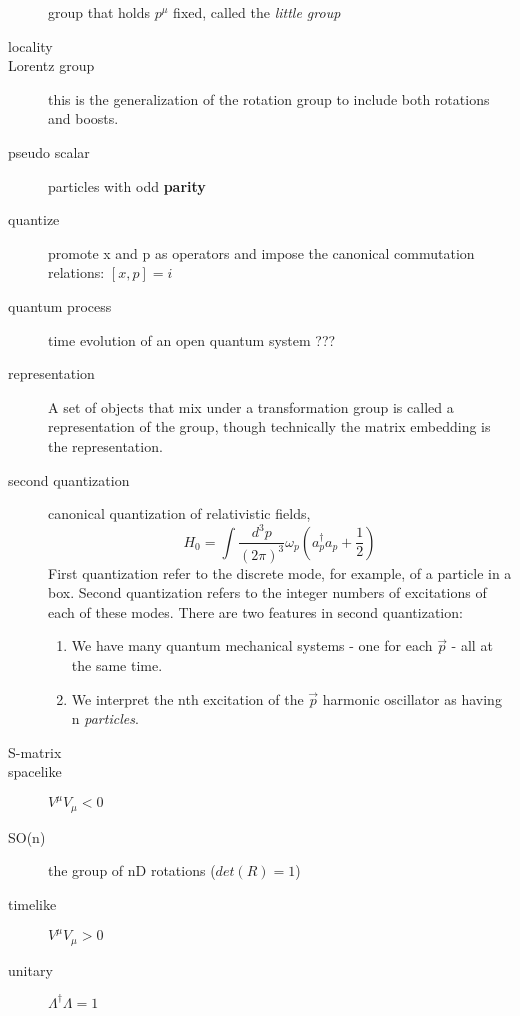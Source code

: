 \begin{description}
	\Poincare{} group that holds $p^\mu$ fixed, called the
	\emph{little group}
    \item [locality]
    \item [Lorentz group] this is the generalization of the rotation group
	to include both rotations and boosts.
    \item [pseudo scalar] particles with odd \textbf{parity}
    \item [quantize]	promote x and p as operators and impose the
	canonical commutation relations:    $[x, p] = i$
    \item [quantum process]  time evolution of an open quantum system ???
    \item [representation] A set of objects that mix under a transformation
	group is called a representation of the group, though technically
	the matrix embedding is the representation.
    \item [second quantization]	canonical quantization of relativistic
	fields, 
	\[
	    H_0 = \int \frac{d^{3}p}{(2\pi)^3}\omega_p(a^{\dag}_p a_p +
	\frac{1}{2})
	\] 
	First quantization refer to the discrete mode, for
	example, of a particle in a box. Second quantization refers to the
	integer numbers of excitations of each of these modes. There are two
	features in second quantization:
	\begin{enumerate}
	    \item We have many quantum mechanical systems - one for each
		$\vec{p}$ - all at the same time.
	    \item We interpret the nth excitation of the $\vec{p}$ harmonic
		oscillator as having n \emph{particles}.
	\end{enumerate}
    \item [S-matrix]
    \item [spacelike]	$V^\mu V_\mu < 0$
    \item [SO(n)] the group of nD rotations ($det(R) = 1$)
    \item [timelike]	$V^\mu V_\mu > 0$
    \item [unitary] $\Lambda^{\dag}\Lambda = 1$
\end{description}

